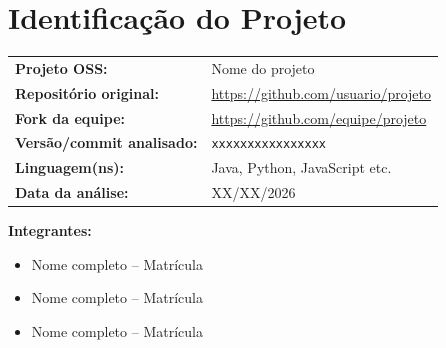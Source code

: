 \section*{Identificação do Projeto}

\begin{tabularx}{\textwidth}{>{\bfseries}l X}
Projeto OSS: & Nome do projeto \\[0.2cm]
Repositório original:
& \url{https://github.com/usuario/projeto} \\[0.2cm]
Fork da equipe:
& \url{https://github.com/equipe/projeto} \\[0.2cm]
Versão/commit analisado:
& \texttt{xxxxxxxxxxxxxxxx} \\[0.2cm]
Linguagem(ns):
& Java, Python, JavaScript etc. \\[0.2cm]
Data da análise:
& XX/XX/2026
\end{tabularx}

\vspace{0.5cm}

\noindent
\textbf{Integrantes:}

\begin{itemize}
    \item Nome completo -- Matrícula
    \item Nome completo -- Matrícula
    \item Nome completo -- Matrícula
\end{itemize}
